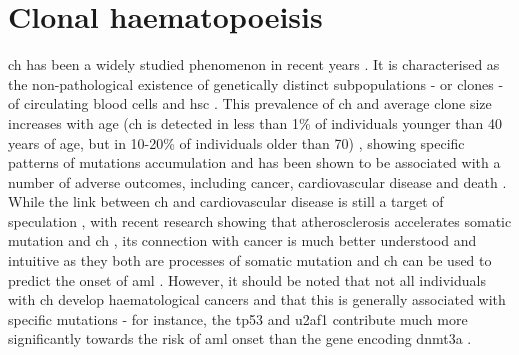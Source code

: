 \section{Clonal haematopoeisis}

\Ac{ch} has been a widely studied phenomenon in recent years \cite{Jaiswal2014-rl,Genovese2014-eu,Xie2014-np,McKerrell2015-rl,Fabre2020-as,Dawoud2020-af}. It is characterised as the non-pathological existence of genetically distinct subpopulations - or clones - of circulating blood cells and \ac{hsc} \cite{Jan2017-rc}. This prevalence of \ac{ch} and average clone size increases with age (\ac{ch} is detected in less than 1\% of individuals younger than 40 years of age, but in 10-20\% of individuals older than 70) \cite{Jaiswal2014-rl}, showing specific patterns of mutations accumulation \cite{McKerrell2015-rl} and has been shown to be associated with a number of adverse outcomes, including cancer, cardiovascular disease and death \cite{Jaiswal2014-rl,Saleheen2017-eq,Genovese2014-eu,Desai2018-pj,Abelson2018-wh}. While the link between \ac{ch} and cardiovascular disease is still a target of speculation \cite{Evans2021-ae}, with recent research showing that atherosclerosis accelerates somatic mutation and \ac{ch} \cite{Heyde2021-nl}, its connection with cancer is much better understood and intuitive as they both are processes of somatic mutation and \ac{ch} can be used to predict the onset of \ac{aml} \cite{Desai2018-pj,Abelson2018-wh}. However, it should be noted that not all individuals with \ac{ch} develop haematological cancers and that this is generally associated with specific mutations - for instance, the \ac{tp53} and \ac{u2af1} contribute much more significantly towards the risk of \ac{aml} onset than the gene encoding \ac{dnmt3a} \cite{Abelson2018-wh}.

